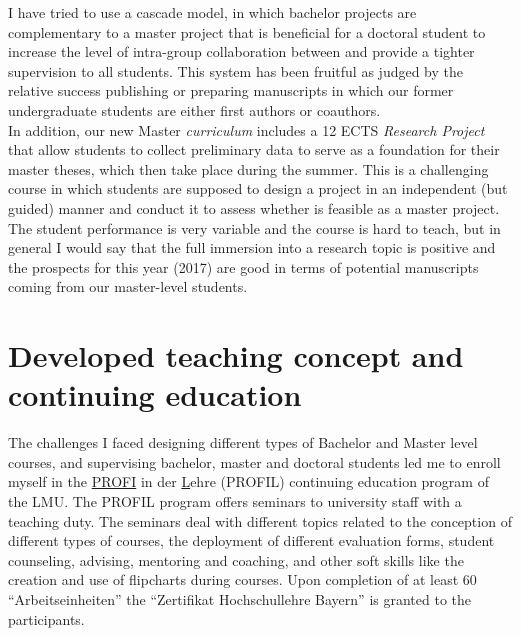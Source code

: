\documentclass[a4paper,11pt]{article}
\begin{document}

I have tried to use a cascade model, in which bachelor projects are complementary to a master project that is beneficial for a doctoral student to increase the level of intra-group collaboration between and provide a tighter supervision to all students. This system has been fruitful as judged by the relative success publishing or preparing manuscripts in which our former undergraduate students are either first authors or coauthors.\\

In addition, our new Master \emph{curriculum} includes a 12 ECTS \emph{Research Project} that allow students to collect preliminary data to serve as a foundation for their master theses, which then take place during the summer. This is a challenging course in which students are supposed to design a project in an independent (but guided) manner and conduct it to assess whether is feasible as a master project. The student performance is very variable and the course is hard to teach, but in general I would say that the full immersion into a research topic is positive and the prospects for this year (2017) are good in terms of potential manuscripts coming from our master-level students.

\section*{Developed teaching concept and continuing education}

The challenges I faced designing different types of Bachelor and Master level courses, and supervising bachelor, master and doctoral students led me to enroll myself in the \underline{PROFI} in der \underline{L}ehre (PROFIL) continuing education program of the LMU. The PROFIL program offers seminars to university staff with a teaching duty. The seminars deal with different topics related to the conception of different types of courses, the deployment of different evaluation forms, student counseling, advising, mentoring and coaching, and other soft skills like the creation and use of flipcharts during courses. Upon completion of at least 60 ``Arbeitseinheiten'' the ``Zertifikat Hochschullehre Bayern'' is granted to the participants.\\
\end{document}
